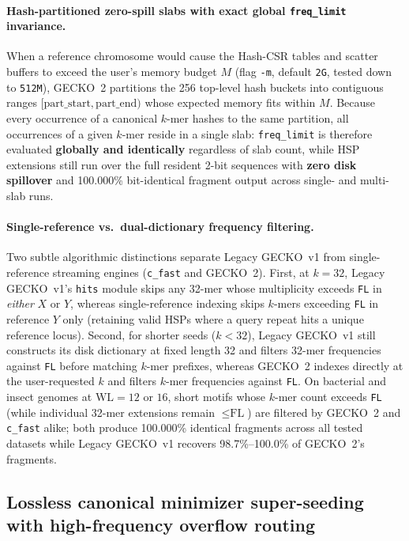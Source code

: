 \documentclass[pdflatex,sn-vancouver,Numbered]{sn-jnl}
\begin{document}
\paragraph{Hash-partitioned zero-spill slabs with exact global \texttt{freq\_limit} invariance.}
When a reference chromosome would cause the Hash-CSR tables and scatter buffers to exceed the user's memory budget $M$ (flag \texttt{-m}, default \texttt{2G}, tested down to \texttt{512M}), GECKO~2 partitions the 256 top-level hash buckets into contiguous ranges $[\text{part\_start}, \text{part\_end})$ whose expected memory fits within $M$. Because every occurrence of a canonical $k$-mer hashes to the same partition, all occurrences of a given $k$-mer reside in a single slab: \texttt{freq\_limit} is therefore evaluated \textbf{globally and identically} regardless of slab count, while HSP extensions still run over the full resident 2-bit sequences with \textbf{zero disk spillover} and 100.000\% bit-identical fragment output across single- and multi-slab runs.

\paragraph{Single-reference vs.\ dual-dictionary frequency filtering.}
Two subtle algorithmic distinctions separate Legacy GECKO~v1 from single-reference streaming engines (\texttt{c\_fast} and GECKO~2). First, at $k=32$, Legacy GECKO~v1's \texttt{hits} module skips any 32-mer whose multiplicity exceeds \texttt{FL} in \emph{either} $X$ or $Y$, whereas single-reference indexing skips $k$-mers exceeding \texttt{FL} in reference $Y$ only (retaining valid HSPs where a query repeat hits a unique reference locus). Second, for shorter seeds ($k < 32$), Legacy GECKO~v1 still constructs its disk dictionary at fixed length 32 and filters 32-mer frequencies against \texttt{FL} before matching $k$-mer prefixes, whereas GECKO~2 indexes directly at the user-requested $k$ and filters $k$-mer frequencies against \texttt{FL}. On bacterial and insect genomes at $\text{WL}=12$ or $16$, short motifs whose $k$-mer count exceeds \texttt{FL} (while individual 32-mer extensions remain $\le \text{FL}$) are filtered by GECKO~2 and \texttt{c\_fast} alike; both produce 100.000\% identical fragments across all tested datasets while Legacy GECKO~v1 recovers 98.7\%--100.0\% of GECKO~2's fragments.

\subsection{Lossless canonical minimizer super-seeding with high-frequency overflow routing}\label{subsec:minimizer}
\end{document}
